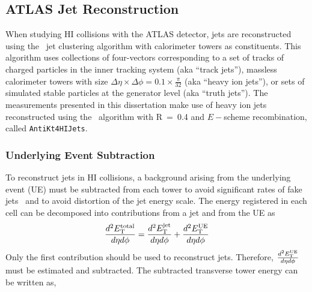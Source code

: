 \subsection{ATLAS Jet Reconstruction}
\label{sec:JetReco}

When studying HI collisions with the ATLAS detector, jets are reconstructed using the \antikt\ jet clustering algorithm \cite{Cacciari:2008gp} with calorimeter towers as constituents. This algorithm uses collections of four-vectors corresponding to a set of tracks of charged particles in the inner tracking system (aka ``track jets''), massless calorimeter towers with size $\Delta \eta \times \Delta \phi = 0.1 \times \frac{\pi}{32}$ (aka ``heavy ion jets''), or sets of simulated stable particles at the generator level (aka ``truth jets''). The measurements presented in this dissertation make use of heavy ion jets reconstructed using the \antikt\ algorithm with R~=~0.4 and $E-$scheme recombination, called \texttt{AntiKt4HIJets}.


\subsubsection{Underlying Event Subtraction}
To reconstruct jets in HI collisions, a background arising from the underlying event (UE) must be subtracted from each tower to avoid significant rates of fake jets~\cite{PhysRevC.86.024908} and to avoid distortion of the jet energy scale. The energy registered in each cell can be decomposed into contributions from a jet and from the UE as
\begin{equation}
    \frac{d^2E_{\text{T}}^{\text{total}}}{d\eta d\phi}=\frac{d^2E_{\text{T}}^{\text{jet}}}{d\eta d\phi}+\frac{d^2E_{\text{T}}^{\text{UE}}}{d\eta d\phi}
\end{equation}
Only the first contribution should be used to reconstruct jets. Therefore, $\frac{d^2E_{\text{T}}^{\text{UE}}}{d\eta d\phi}$ must be estimated and subtracted.
The subtracted transverse tower energy can be written as,

